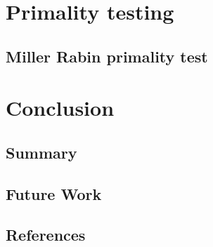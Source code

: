 \documentclass[12pt,a4paper]{report}
\begin{document}
\chapter{Primality testing}
\section{Miller Rabin primality test}

\chapter{Conclusion}
\section{Summary}
\section{Future Work}
\section{References}

% 
% 
\end{document}
